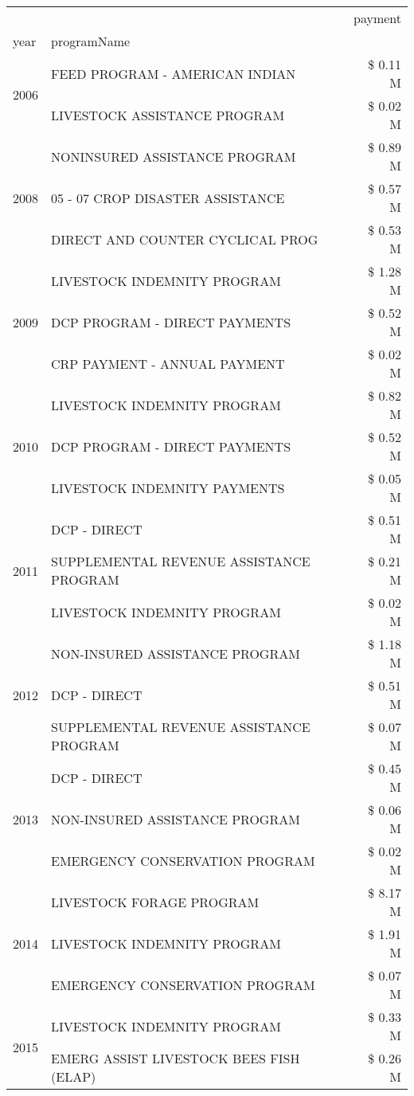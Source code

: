 \begin{tabular}{llr}
\toprule
 &  & payment \\
year & programName &  \\
\midrule
\multirow[t]{2}{*}{2006} & FEED PROGRAM - AMERICAN INDIAN & \$ 0.11 M \\
 & LIVESTOCK ASSISTANCE PROGRAM & \$ 0.02 M \\
\cline{1-3}
\multirow[t]{3}{*}{2008} & NONINSURED ASSISTANCE PROGRAM & \$ 0.89 M \\
 & 05 - 07 CROP DISASTER ASSISTANCE & \$ 0.57 M \\
 & DIRECT AND COUNTER CYCLICAL PROG & \$ 0.53 M \\
\cline{1-3}
\multirow[t]{3}{*}{2009} & LIVESTOCK INDEMNITY PROGRAM & \$ 1.28 M \\
 & DCP PROGRAM - DIRECT PAYMENTS & \$ 0.52 M \\
 & CRP PAYMENT - ANNUAL PAYMENT & \$ 0.02 M \\
\cline{1-3}
\multirow[t]{3}{*}{2010} & LIVESTOCK INDEMNITY PROGRAM & \$ 0.82 M \\
 & DCP PROGRAM - DIRECT PAYMENTS & \$ 0.52 M \\
 & LIVESTOCK INDEMNITY PAYMENTS & \$ 0.05 M \\
\cline{1-3}
\multirow[t]{3}{*}{2011} & DCP - DIRECT & \$ 0.51 M \\
 & SUPPLEMENTAL REVENUE ASSISTANCE PROGRAM & \$ 0.21 M \\
 & LIVESTOCK INDEMNITY PROGRAM & \$ 0.02 M \\
\cline{1-3}
\multirow[t]{3}{*}{2012} & NON-INSURED ASSISTANCE PROGRAM & \$ 1.18 M \\
 & DCP - DIRECT & \$ 0.51 M \\
 & SUPPLEMENTAL REVENUE ASSISTANCE PROGRAM & \$ 0.07 M \\
\cline{1-3}
\multirow[t]{3}{*}{2013} & DCP - DIRECT & \$ 0.45 M \\
 & NON-INSURED ASSISTANCE PROGRAM & \$ 0.06 M \\
 & EMERGENCY CONSERVATION PROGRAM & \$ 0.02 M \\
\cline{1-3}
\multirow[t]{3}{*}{2014} & LIVESTOCK FORAGE PROGRAM & \$ 8.17 M \\
 & LIVESTOCK INDEMNITY PROGRAM & \$ 1.91 M \\
 & EMERGENCY CONSERVATION PROGRAM & \$ 0.07 M \\
\cline{1-3}
\multirow[t]{3}{*}{2015} & LIVESTOCK INDEMNITY PROGRAM & \$ 0.33 M \\
 & EMERG ASSIST LIVESTOCK BEES FISH (ELAP) & \$ 0.26 M \\

\end{tabular}
